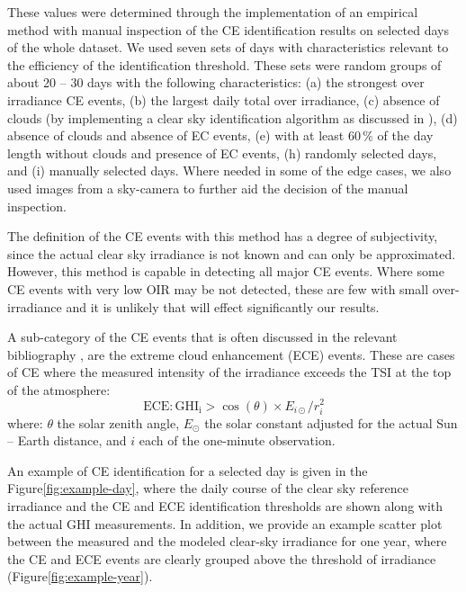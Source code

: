 \documentclass[preprint, 5p,
authoryear]{elsarticle} %
\begin{document}
These values were determined through the implementation of an empirical
method with manual inspection of the CE identification results on
selected days of the whole dataset. We used seven sets of days with
characteristics relevant to the efficiency of the identification
threshold. These sets were random groups of about 20 -- 30 days with the
following characteristics: (a) the strongest over irradiance CE events,
(b) the largest daily total over irradiance, (c) absence of clouds (by
implementing a clear sky identification algorithm as discussed in
\citet{Natsis2023}), (d) absence of clouds and absence of EC events, (e)
with at least \(60\,\%\) of the day length without clouds and presence
of EC events, (h) randomly selected days, and (i) manually selected
days. Where needed in some of the edge cases, we also used images from a
sky-camera to further aid the decision of the manual inspection.

The definition of the CE events with this method has a degree of
subjectivity, since the actual clear sky irradiance is not known and can
only be approximated. However, this method is capable in detecting all
major CE events. Where some CE events with very low OIR may be not
detected, these are few with small over-irradiance and it is unlikely
that will effect significantly our results.

A sub-category of the CE events that is often discussed in the relevant
bibliography \citep{Cordero2023, Martins2022, Yordanov2015}, are the
extreme cloud enhancement (ECE) events. These are cases of CE where the
measured intensity of the irradiance exceeds the TSI at the top of the
atmosphere: \begin{equation}
\text{ECE}: \text{GHI}_\text{i} > \cos(\theta) \times E_{i\odot} / r_{i}^2
\label{eq:ECE}
\end{equation} where: \(\theta\) the solar zenith angle, \(E_{\odot}\)
the solar constant adjusted for the actual Sun -- Earth distance, and
\(i\) each of the one-minute observation.

An example of CE identification for a selected day is given in the
Figure\nobreakspace{}\ref{fig:example-day}, where the daily course of
the clear sky reference irradiance and the CE and ECE identification
thresholds are shown along with the actual GHI measurements. In
addition, we provide an example scatter plot between the measured and
the modeled clear-sky irradiance for one year, where the CE and ECE
events are clearly grouped above the threshold of irradiance
(Figure\nobreakspace{}\ref{fig:example-year}).
\end{document}
